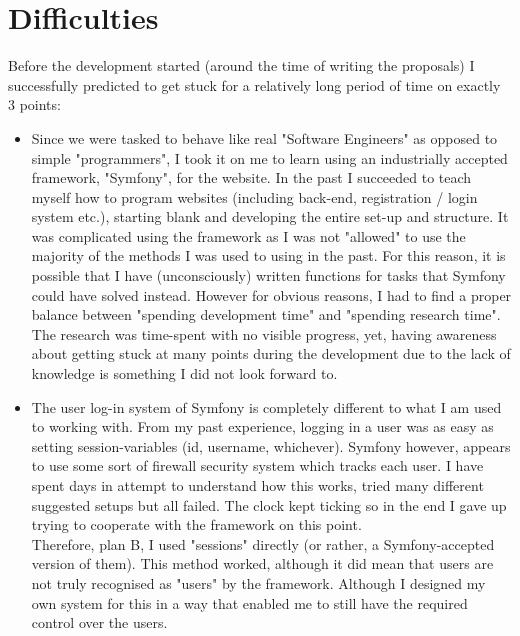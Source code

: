 \documentclass[12pt]{report}
\begin{document}
\section*{Difficulties}
Before the development started (around the time of writing the proposals) I successfully predicted to get stuck for a relatively long period of time on exactly 3 points:
\begin{itemize}
\item Since we were tasked to behave like real "Software Engineers" as opposed to simple "programmers", I took it on me to learn using an industrially accepted framework, "Symfony", for the website. In the past I succeeded to teach myself how to program websites (including back-end, registration / login system etc.), starting blank and developing the entire set-up and structure. It was complicated using the framework as I was not "allowed" to use the majority of the methods I was used to using in the past. For this reason, it is possible that I have (unconsciously) written functions for tasks that Symfony could have solved instead. However for obvious reasons, I had to find a proper balance between "spending development time" and "spending research time".\\
The research was time-spent with no visible progress, yet, having awareness about getting stuck at many points during the development due to the lack of knowledge is something I did not look forward to.

\item The user log-in system of Symfony is completely different to what I am used to working with. From my past experience, logging in a user was as easy as setting session-variables (id, username, whichever). Symfony however, appears to use some sort of firewall security system which tracks each user. I have spent days in attempt to understand how this works, tried many different suggested setups but all failed. The clock kept ticking so in the end I gave up trying to cooperate with the framework on this point.\\
Therefore, plan B, I used "sessions" directly (or rather, a Symfony-accepted version of them). This method worked, although it did mean that users are not truly recognised as "users" by the framework. Although I designed my own system for this in a way that enabled me to still have the required control over the users.


\end{itemize}
\end{document}

